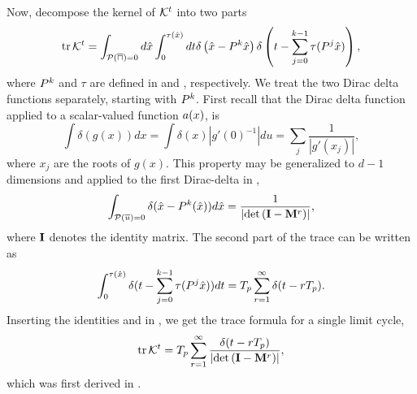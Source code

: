 \begin{description}
%
Now, decompose the kernel of ${\cal K}^t$  into two parts
%
\begin{equation}
\mbox{\rm tr}\, {\cal K}^t = \int_{\mathcal{P(\overline{u})}=0}d\hat{x} \int_0^{\tau(\hat{x})} dt \delta \left (\hat{x}-P^{k}\hat{x}\right ) \delta \left (t-\sum_{j=0}^{k-1}\tau(P^j\hat{x})\right ),
\label{eq:app:kerfac}
\end{equation}
%
where $P^k$ and $\tau$ are defined in  and
, respectively.  We treat the two Dirac delta
functions separately, starting with $P^k$. First recall that the
Dirac delta function applied to a scalar-valued function $a(x)$,
is
%
\[
\int \delta (g(x)) dx = \int \delta (x) |g'(0)^{-1}| du =  \sum_j\frac{1}{|g'(x_j)|},
\]
%
where $x_j$ are the roots of $g(x)$. This property may be generalized
to $d-1$ dimensions and applied to the first Dirac-delta in
,
%
\begin{equation}
\int_{\mathcal{P}(\overline{u})=0}\delta(\hat{x}-P^{k}(\hat{x}))d\hat{x} = \frac{1}{|\mbox{\rm det}\, ({\bf\mathbf{I}}- {\bf\mathbf{M}}^r)|},
\label{eq:app:det0}
\end{equation}
%
where ${\bf\mathbf{I}}$ denotes the identity matrix.   The second part of the
trace can be written as %
%
\begin{equation}
\int_{0}^{\tau(\hat{x})}\delta (t-\sum_{j=0}^{k-1}\tau(P^j\hat{x}))d t
   ={T_{p}} \sum_{r=1}^\infty\delta (t-r{T_{p}}).
\label{eq:app:fac2lim}
\end{equation}
%
%
Inserting the  identities  and
 in , we get the trace
formula for a single limit cycle,
%
\begin{equation}
\mbox{\rm tr}\, {\cal K}^t = {T_{p}}\sum_{r=1}^\infty \frac{\delta (t-r{T_{p}})}{|\mbox{\rm det}\, ({\bf\mathbf{I}}- {\bf\mathbf{M}}^r)|},
\label{eq:traceFormula0}
\end{equation}
%
which was first derived in . %



\end{description}

